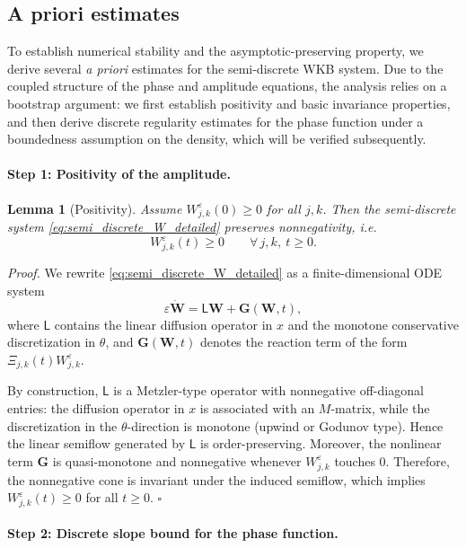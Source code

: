 \documentclass[11pt, dina4, amsfont12]{article}
\newtheorem{lemma}{Lemma}[section]
\begin{document}
\subsection{A priori estimates}

To establish numerical stability and the asymptotic-preserving property, we
derive several \emph{a priori} estimates for the semi-discrete WKB system.
Due to the coupled structure of the phase and amplitude equations, the analysis
relies on a bootstrap argument: we first establish positivity and basic
invariance properties, and then derive discrete regularity estimates for the
phase function under a boundedness assumption on the density, which will be
verified subsequently.

\medskip

\paragraph{Step 1: Positivity of the amplitude.}

\begin{lemma}[Positivity]\label{lem:positivity_W}
Assume $W_{j,k}^\varepsilon(0)\ge0$ for all $j,k$. Then the semi-discrete system
\eqref{eq:semi_discrete_W_detailed} preserves nonnegativity, i.e.
\[
W_{j,k}^\varepsilon(t)\ge0
\qquad
\forall\, j,k,\ t\ge0 .
\]
\end{lemma}

\textit{Proof.}
We rewrite \eqref{eq:semi_discrete_W_detailed} as a finite-dimensional ODE system
\[
\varepsilon \dot{\mathbf W}
=
\mathsf{L}\mathbf W + \mathbf G(\mathbf W,t),
\]
where $\mathsf{L}$ contains the linear diffusion operator in $x$ and the monotone
conservative discretization in $\theta$, and $\mathbf G(\mathbf W,t)$ denotes the
reaction term of the form $\Xi_{j,k}(t)W_{j,k}^\varepsilon$.

By construction, $\mathsf{L}$ is a Metzler-type operator with nonnegative
off-diagonal entries: the diffusion operator in $x$ is associated with an
$M$-matrix, while the discretization in the $\theta$-direction is monotone
(upwind or Godunov type). Hence the linear semiflow generated by $\mathsf{L}$ is
order-preserving. Moreover, the nonlinear term $\mathbf G$ is quasi-monotone and
nonnegative whenever $W_{j,k}^\varepsilon$ touches 0. Therefore, the nonnegative cone is
invariant under the induced semiflow, which implies
$W_{j,k}^\varepsilon(t)\ge0$ for all $t\ge0$.
\hfill$\square$

\medskip

\paragraph{Step 2: Discrete slope bound for the phase function.}
\end{document}
